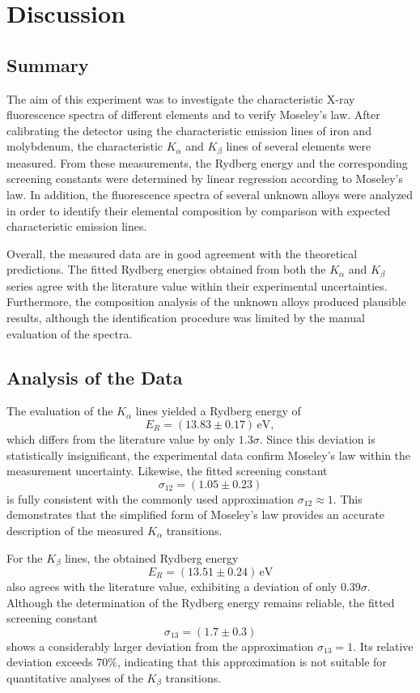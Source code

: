 \chapter{Discussion}
\label{ch:Diskussion}

\section{Summary}
\label{sec:Zusammenfassung}

The aim of this experiment was to investigate the characteristic X-ray fluorescence spectra of different elements and to verify Moseley's law. After calibrating the detector using the characteristic emission lines of iron and molybdenum, the characteristic $K_\alpha$ and $K_\beta$ lines of several elements were measured. From these measurements, the Rydberg energy and the corresponding screening constants were determined by linear regression according to Moseley's law. In addition, the fluorescence spectra of several unknown alloys were analyzed in order to identify their elemental composition by comparison with expected characteristic emission lines.

Overall, the measured data are in good agreement with the theoretical predictions. The fitted Rydberg energies obtained from both the $K_\alpha$ and $K_\beta$ series agree with the literature value within their experimental uncertainties. Furthermore, the composition analysis of the unknown alloys produced plausible results, although the identification procedure was limited by the manual evaluation of the spectra.

\section{Analysis of the Data}
\label{sec:Analyse}

The evaluation of the $K_\alpha$ lines yielded a Rydberg energy of
\[
E_R = (13.83 \pm 0.17)\,\mathrm{eV},
\]
which differs from the literature value by only $1.3\sigma$. Since this deviation is statistically insignificant, the experimental data confirm Moseley's law within the measurement uncertainty. Likewise, the fitted screening constant
\[
\sigma_{12} = (1.05 \pm 0.23)
\]
is fully consistent with the commonly used approximation $\sigma_{12}\approx1$. This demonstrates that the simplified form of Moseley's law provides an accurate description of the measured $K_\alpha$ transitions.

For the $K_\beta$ lines, the obtained Rydberg energy
\[
E_R = (13.51 \pm 0.24)\,\mathrm{eV}
\]
also agrees with the literature value, exhibiting a deviation of only $0.39\sigma$. Although the determination of the Rydberg energy remains reliable, the fitted screening constant
\[
\sigma_{13} = (1.7 \pm 0.3)
\]
shows a considerably larger deviation from the approximation $\sigma_{13}=1$. Its relative deviation exceeds $70\%$, indicating that this approximation is not suitable for quantitative analyses of the $K_\beta$ transitions.

